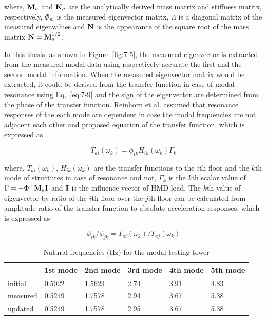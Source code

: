 where, $\mathbf{M}_{a}$ and $\mathbf{K}_{a}$ are the analytically derived mass matrix and stiffness matrix, respectively, $\Phi_{m}$ is the measured eigenvector matrix, $\Lambda$ is a diagonal matrix of the measured eigenvalues and $\mathbf{N}$ is the appearance of the square root of the mass matrix $\mathbf{N} = \mathbf{M}_{a}^{1/2}$.

In this thesis, as shown in Figure~\ref{fig:7-5}, the measured eigenvector is extracted from the measured modal data using respectively accurate the first and the second modal information. When the measured eigenvector matrix would be extracted, it could be derived from the transfer function in case of modal resonance using Eq.~\eqref{eq:7-9} and the sign of the eigenvector are determined from the phase of the transfer function. Reinhorn et al. assumed that resonance responses of the each mode are dependent in case the modal frequencies are not adjacent each other and proposed equation of the transfer function, which is expressed as

\begin{equation} \label{eq:7-9}
T_{ai}\left(\omega_{k}\right) = \phi_{ik}H_{ik}\left(\omega_{k}\right)\Gamma_{k}
\end{equation}

where, $T_{ai}\left(\omega_{k}\right)$, $H_{ik}\left(\omega_{k}\right)$ are the transfer functions to the $i$th floor and the $k$th mode of structures in case of resonance and not, $\Gamma_{k}$ is the $k$th scalar value of $\Gamma = -\Phi^{\top}\mathbf{M}_{a}\mathbf{I}$ and $\mathbf{I}$ is the influence vector of HMD load. The $k$th value of eigenvector by ratio of the $i$th floor over the $j$th floor can be calculated from amplitude ratio of the transfer function to absolute acceleration responses, which is expressed as

\begin{equation}\label{eq:7-10}
\phi_{ik}/\phi_{jk} = T_{ai}\left(\omega_{k}\right)/T_{aj}\left(\omega_{k}\right)
\end{equation}

\begin{table}[ht]
\centering
\begin{tabularx}{\textwidth}{@{}X|X|X|X|X|X@{}}
\toprule[1pt]\midrule[0.3pt]
& 1st mode & 2nd mode & 3rd mode & 4th mode & 5th mode\\ \midrule[0.3pt]
initial & 0.5022 & 1.5623 & 2.74 & 3.91 & 4.83\\
measured& 0.5249 & 1.7578 & 2.94 & 3.67 & 5.38\\
updated & 0.5249 & 1.7578 & 2.95 & 3.67 & 5.38\\
\bottomrule
\end{tabularx}
\caption{Natural frequencies (Hz) for the modal testing tower}
\label{tab:7-3}
\end{table}


